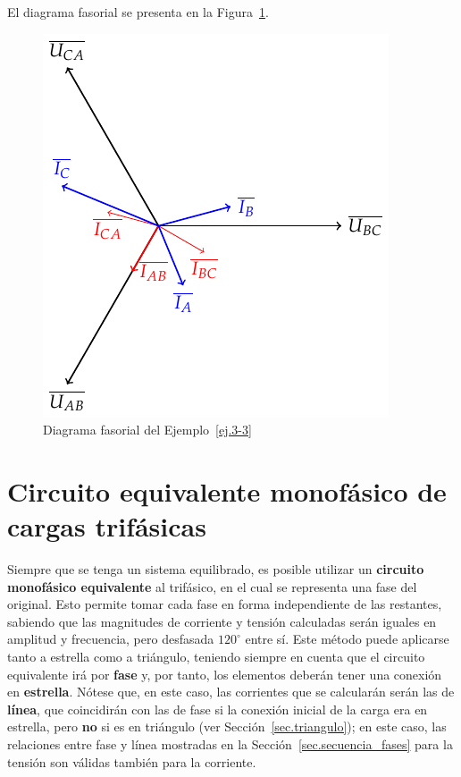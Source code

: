 \begin{example}
	    El diagrama fasorial se presenta en la Figura~\ref{fig.diagrama_ejemplo_3-3}. 
	    \begin{figure}[H]
	        \centering
	        \includegraphics{../figs/diagrama_3_3.pdf}
	        \caption{Diagrama fasorial del Ejemplo~\ref{ej.3-3}}
	       \label{fig.diagrama_ejemplo_3-3}
	    \end{figure}
	\end{example}
	
	\section{Circuito equivalente monofásico de cargas trifásicas}\label{sec.c_eq_mon}
	 Siempre que se tenga un sistema equilibrado, es posible utilizar un \textbf{circuito monofásico equivalente} al trifásico, en el cual se representa una fase del original. Esto permite tomar cada fase en forma independiente de las restantes, sabiendo que las magnitudes de corriente y tensión calculadas serán iguales en amplitud y frecuencia, pero desfasada $120^\circ$ entre sí. Este método puede aplicarse tanto a estrella como a triángulo, teniendo siempre en cuenta que el circuito equivalente irá por \textbf{fase} y, por tanto, los elementos deberán tener una conexión en \textbf{estrella}. Nótese que, en este caso, las corrientes que se calcularán serán las de \textbf{línea}, que coincidirán con las de fase si la conexión inicial de la carga era en estrella, pero \textbf{no} si es en triángulo (ver Sección~\ref{sec.triangulo}); en este caso, las relaciones entre fase y línea mostradas en la Sección~\ref{sec.secuencia_fases} para la tensión son válidas también para la corriente.
	 

